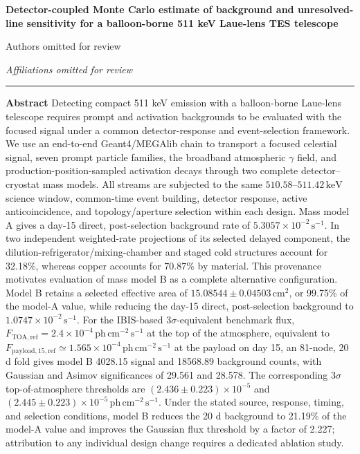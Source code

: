 \documentclass[11pt]{article}
\newcommand{\keV}{\ensuremath{\,\mathrm{keV}}}
\newcommand{\phcms}{\ensuremath{\,\mathrm{ph\,cm^{-2}\,s^{-1}}}}
\newcommand{\cps}{\ensuremath{\,\mathrm{s^{-1}}}}
\newcommand{\ftoaref}{F_{\mathrm{TOA,ref}}}
\newcommand{\fpayloadref}{F_{\mathrm{payload,15,ref}}}
\begin{document}
\thispagestyle{fancy}
\begin{flushleft}
{\LARGE\bfseries Detector-coupled Monte Carlo estimate of background and unresolved-line sensitivity for a balloon-borne 511 keV Laue-lens TES telescope\par}
\vspace{1.1em}
{\large Authors omitted for review\par}
\vspace{0.3em}
{\normalsize\itshape Affiliations omitted for review\par}
\end{flushleft}
\vspace{0.7em}
\noindent\rule{\textwidth}{0.4pt}
\vspace{0.5em}

\noindent\textbf{Abstract}\hspace{0.7em}
Detecting compact 511 keV emission with a balloon-borne Laue-lens telescope
requires prompt and activation backgrounds to be evaluated with the focused
signal under a common detector-response and event-selection framework. We use
an end-to-end Geant4/MEGAlib chain to transport a focused celestial signal,
seven prompt particle families, the broadband atmospheric $\gamma$ field, and
production-position-sampled activation decays through two complete
detector--cryostat mass models. All streams are subjected to the same
$510.58$--$511.42\keV$ science window, common-time event building, detector
response, active anticoincidence, and topology/aperture selection within each
design. Mass model A gives a day-15 direct, post-selection background rate of
$5.3057\times10^{-2}\cps$. In two independent weighted-rate projections of its
selected delayed component, the dilution-refrigerator/mixing-chamber and staged
cold structures account for 32.18\%, whereas copper accounts for 70.87\% by
material.
This provenance motivates evaluation of mass model B as a complete alternative
configuration. Model B retains a selected effective area of
$15.08544\pm0.04503\,\mathrm{cm^2}$, or 99.75\% of the model-A value, while
reducing the day-15 direct, post-selection background to $1.0747\times10^{-2}\cps$.
For the IBIS-based $3\sigma$-equivalent benchmark flux,
$\ftoaref=2.4\times10^{-4}\phcms$ at the top of
the atmosphere, equivalent to $\fpayloadref\simeq1.565\times10^{-4}\phcms$ at
the payload on day 15, an 81-node, 20 d fold gives model B 4028.15 signal and
18568.89 background counts, with Gaussian and Asimov significances of 29.561
and 28.578. The corresponding $3\sigma$ top-of-atmosphere thresholds are
$(2.436\pm0.223)\times10^{-5}$ and
$(2.445\pm0.223)\times10^{-5}\phcms$. Under the stated source, response,
timing, and selection conditions, model B reduces the 20 d background to
21.19\% of the model-A value and improves the Gaussian flux threshold by a
factor of 2.227; attribution to any individual design change requires a
dedicated ablation study.
\end{document}
